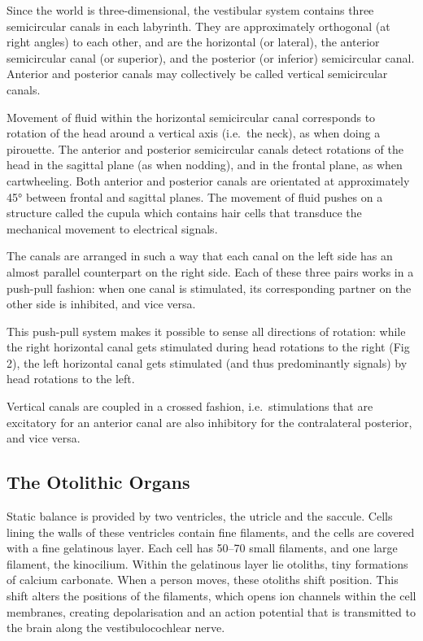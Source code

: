 Since the world is three-dimensional, the vestibular system contains three semicircular canals in each labyrinth. They are approximately orthogonal (at right angles) to each other, and are the horizontal (or lateral), the anterior semicircular canal (or superior), and the posterior (or inferior) semicircular canal. Anterior and posterior canals may collectively be called vertical semicircular canals.

Movement of fluid within the horizontal semicircular canal corresponds to rotation of the head around a vertical axis (i.e.~the neck), as when doing a pirouette.
The anterior and posterior semicircular canals detect rotations of the head in the sagittal plane (as when nodding), and in the frontal plane, as when cartwheeling. Both anterior and posterior canals are orientated at approximately 45° between frontal and sagittal planes.
The movement of fluid pushes on a structure called the cupula which contains hair cells that transduce the mechanical movement to electrical signals.

The canals are arranged in such a way that each canal on the left side has an almost parallel counterpart on the right side. Each of these three pairs works in a push-pull fashion: when one canal is stimulated, its corresponding partner on the other side is inhibited, and vice versa.

This push-pull system makes it possible to sense all directions of rotation: while the right horizontal canal gets stimulated during head rotations to the right (Fig 2), the left horizontal canal gets stimulated (and thus predominantly signals) by head rotations to the left.

Vertical canals are coupled in a crossed fashion, i.e.~stimulations that are excitatory for an anterior canal are also inhibitory for the contralateral posterior, and vice versa.

\hypertarget{the-otolithic-organs}{%
\subsection{The Otolithic Organs}\label{the-otolithic-organs}}

Static balance is provided by two ventricles, the utricle and the saccule. Cells lining the walls of these ventricles contain fine filaments, and the cells are covered with a fine gelatinous layer. Each cell has 50--70 small filaments, and one large filament, the kinocilium. Within the gelatinous layer lie otoliths, tiny formations of calcium carbonate. When a person moves, these otoliths shift position. This shift alters the positions of the filaments, which opens ion channels within the cell membranes, creating depolarisation and an action potential that is transmitted to the brain along the vestibulocochlear nerve.

